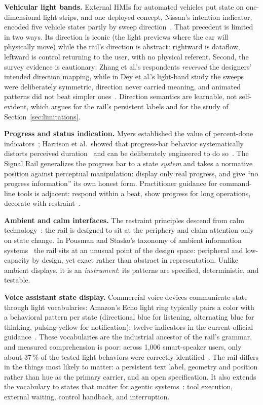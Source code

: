 \documentclass[11pt]{article}
\begin{document}
\textbf{Vehicular light bands.} External HMIs for automated vehicles
put state on one-dimensional light strips, and one deployed concept, Nissan's intention indicator, encoded five vehicle states
partly by sweep direction~\cite{zhang2017}. That precedent is limited in two ways. Its direction is iconic (the light previews where the car will physically move) while the rail's direction is abstract:
rightward is dataflow, leftward is control returning to the user, with
no physical referent. Second, the survey evidence is cautionary: Zhang et
al.'s respondents \emph{reversed} the designers' intended direction
mapping, while in Dey et al.'s light-band study the sweeps were
deliberately symmetric, direction never carried meaning, and animated
patterns did not beat simpler ones~\cite{dey2020}. Direction semantics are learnable, not self-evident, which argues for the rail's persistent labels and for the study of Section~\ref{sec:limitations}.

\textbf{Progress and status indication.} Myers established the value of
percent-done indicators~\cite{myers1985}; Harrison et al.\ showed that
progress-bar behavior systematically distorts perceived
duration~\cite{harrison2007} and can be deliberately engineered to do
so~\cite{harrison2010}. The Signal Rail generalizes the progress bar to a
state \emph{system} and takes a normative position against perceptual
manipulation: display only real progress, and give ``no progress
information'' its own honest form. Practitioner guidance for
command-line tools is adjacent: respond within a beat, show progress for
long operations, decorate with restraint~\cite{clig}.

\textbf{Ambient and calm interfaces.} The restraint principles descend
from calm technology~\cite{weiser1997}: the rail is designed to sit at
the periphery and claim attention only on state change. In Pousman and
Stasko's taxonomy of ambient information systems~\cite{pousman2006} the
rail sits at an unusual point of the design space: peripheral and
low-capacity by design, yet exact rather than abstract in
representation. Unlike ambient
displays, it is an \emph{instrument}: its patterns are specified,
deterministic, and testable.

\textbf{Voice assistant state display.} Commercial voice devices
communicate state through light vocabularies: Amazon's Echo light ring
typically pairs a color with a behavioral pattern per state (directional blue for listening, alternating blue for thinking, pulsing yellow for notification); twelve indicators in the current official
guidance~\cite{alexaring}. These vocabularies are the industrial
ancestor of the rail's grammar, and measured comprehension is poor: across 1{,}006 smart-speaker users, only about 37\,\% of
the tested light behaviors were correctly identified~\cite{kunchay2021}. The rail differs in the things most likely to matter: a persistent text label, geometry and position rather than hue as the primary carrier, and an open specification. It also extends the vocabulary to states that matter for agentic systems~\cite{amershi2019,dhanorkar2026}: tool execution, external waiting, control handback, and interruption.
\end{document}
